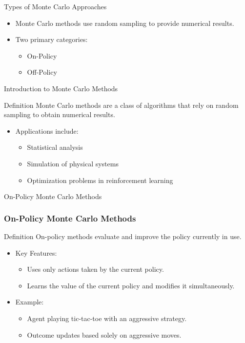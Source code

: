 \documentclass[aspectratio=169]{beamer}
\begin{document}
\begin{frame}{Types of Monte Carlo Approaches}
    \begin{itemize}
        \item Monte Carlo methods use random sampling to provide numerical results.
        \item Two primary categories:
        \begin{itemize}
            \item On-Policy
            \item Off-Policy
        \end{itemize}
    \end{itemize}
\end{frame}

\begin{frame}{Introduction to Monte Carlo Methods}
    \begin{block}{Definition}
        Monte Carlo methods are a class of algorithms that rely on random sampling to obtain numerical results.
    \end{block}
    \begin{itemize}
        \item Applications include:
        \begin{itemize}
            \item Statistical analysis
            \item Simulation of physical systems
            \item Optimization problems in reinforcement learning
        \end{itemize}
    \end{itemize}
\end{frame}

\begin{frame}{On-Policy Monte Carlo Methods}
    \frametitle{On-Policy Monte Carlo Methods}
    
    \begin{block}{Definition}
        On-policy methods evaluate and improve the policy currently in use.
    \end{block}

    \begin{itemize}
        \item Key Features:
        \begin{itemize}
            \item Uses only actions taken by the current policy.
            \item Learns the value of the current policy and modifies it simultaneously.
        \end{itemize}
        
        \item Example:
        \begin{itemize}
            \item Agent playing tic-tac-toe with an aggressive strategy.
            \item Outcome updates based solely on aggressive moves.
        \end{itemize}
    \end{itemize}
\end{frame}
\end{document}
